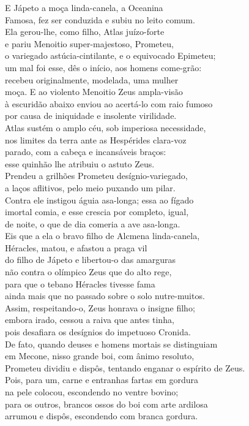 \begin{pages}
\begin{Rightside}
\quad{}E Jápeto a moça linda-canela, a Oceanina\\
Famosa, fez ser conduzida e subiu no leito comum.\\
Ela gerou-lhe, como filho, Atlas juízo-forte\\
e pariu Menoitio super-majestoso, Prometeu, \\
o variegado astúcia-cintilante, e o equivocado Epimeteu;\\
um mal foi esse, dês o início, aos homens come-grão:\\
recebeu originalmente, modelada, uma mulher\\
moça. E ao violento Menoitio Zeus ampla-visão\\
à escuridão abaixo enviou ao acertá-lo com raio fumoso \\
por causa de iniquidade e insolente virilidade.\\
Atlas sustém o amplo céu, sob imperiosa necessidade,\\
nos limites da terra ante as Hespérides clara-voz\\
parado, com a cabeça e incansáveis braços:\\
esse quinhão lhe atribuiu o astuto Zeus. \\
Prendeu a grilhões Prometeu desígnio-variegado,\\
a laços aflitivos, pelo meio puxando um pilar.\\
Contra ele instigou águia asa-longa; essa ao fígado\\
imortal comia, e esse crescia por completo, igual,\\
de noite, o que de dia comeria a ave asa-longa. \\
Eis que a ela o bravo filho de Alcmena linda-canela,\\
Héracles, matou, e afastou a praga vil\\
do filho de Jápeto e libertou-o das amarguras\\
não contra o olímpico Zeus que do alto rege,\\
para que o tebano Héracles tivesse fama \\
ainda mais que no passado sobre o solo nutre-muitos.\\
Assim, respeitando-o, Zeus honrava o insigne filho;\\
embora irado, cessou a raiva que antes tinha,\\
pois desafiara os desígnios do impetuoso Cronida.\\

\quad{}De fato, quando deuses e homens mortais se distinguiam \\
em Mecone, nisso grande boi, com ânimo resoluto,\\
Prometeu dividiu e dispôs, tentando enganar o espírito de Zeus.\\
Pois, para um, carne e entranhas fartas em gordura\\
na pele colocou, escondendo no ventre bovino;\\
para os outros, brancos ossos do boi com arte ardilosa \\
arrumou e dispôs, escondendo com branca gordura.\\


\end{Rightside}
\end{pages}
